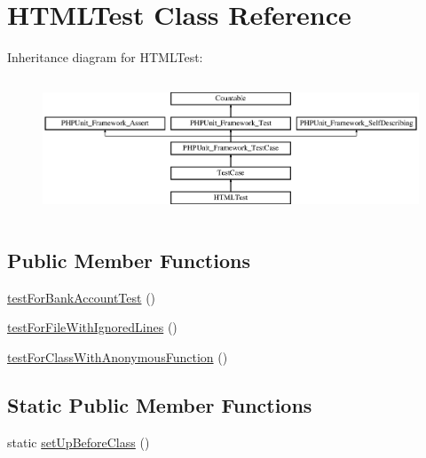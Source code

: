 \hypertarget{class_sebastian_bergmann_1_1_code_coverage_1_1_report_1_1_html_1_1_h_t_m_l_test}{}\section{H\+T\+M\+L\+Test Class Reference}
\label{class_sebastian_bergmann_1_1_code_coverage_1_1_report_1_1_html_1_1_h_t_m_l_test}
Inheritance diagram for H\+T\+M\+L\+Test\+:\begin{figure}[H]
\begin{center}
\leavevmode
\includegraphics[height=4.129793cm]{class_sebastian_bergmann_1_1_code_coverage_1_1_report_1_1_html_1_1_h_t_m_l_test}
\end{center}
\end{figure}
\subsection*{Public Member Functions}
\begin{DoxyCompactItemize}
\item 
\mbox{\hyperlink{class_sebastian_bergmann_1_1_code_coverage_1_1_report_1_1_html_1_1_h_t_m_l_test_ad9fed07aad4f99ced47846343159b5f9}{test\+For\+Bank\+Account\+Test}} ()
\item 
\mbox{\hyperlink{class_sebastian_bergmann_1_1_code_coverage_1_1_report_1_1_html_1_1_h_t_m_l_test_a56dd0d19a0cf97658af874006a48fcf5}{test\+For\+File\+With\+Ignored\+Lines}} ()
\item 
\mbox{\hyperlink{class_sebastian_bergmann_1_1_code_coverage_1_1_report_1_1_html_1_1_h_t_m_l_test_a1f10d167be4113a4aa37e6c1633e4d01}{test\+For\+Class\+With\+Anonymous\+Function}} ()
\end{DoxyCompactItemize}
\subsection*{Static Public Member Functions}
\begin{DoxyCompactItemize}
\item 
static \mbox{\hyperlink{class_sebastian_bergmann_1_1_code_coverage_1_1_report_1_1_html_1_1_h_t_m_l_test_a80ef9eb20e7443b38276fb4647985fb7}{set\+Up\+Before\+Class}} ()
\end{DoxyCompactItemize}
